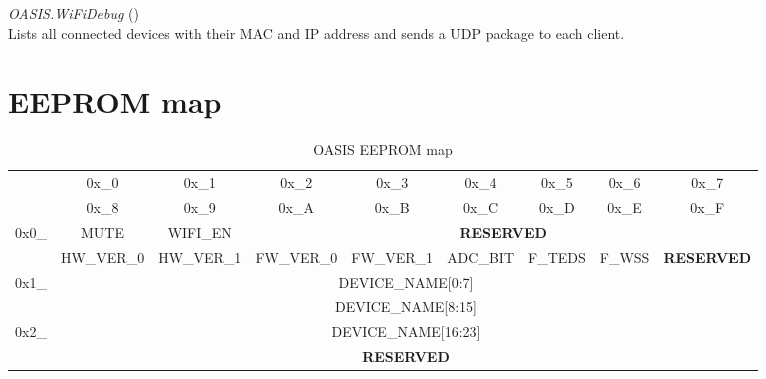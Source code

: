 \documentclass[11pt, a4paper]{article}
\begin{document}
\vspace{3mm}
\textcolor{TBlue}{\textit{OASIS.WiFiDebug}} ()\vspace{3mm}\\
Lists all connected devices with their MAC and IP address and sends a UDP package to each client.

\section*{EEPROM map}
\begin{table}[h!]
	\centering
	\begin{tabular}{c|c|c|c|c|c|c|c|c}
		& 0x\_0 & 0x\_1 & 0x\_2 & 0x\_3 & 0x\_4 & 0x\_5 & 0x\_6 & 0x\_7 \\
		& 0x\_8 & 0x\_9 & 0x\_A & 0x\_B & 0x\_C & 0x\_D & 0x\_E & 0x\_F \\
		\hline
		\multirow{2}{*}{0x0\_} & MUTE & WIFI\_EN & \multicolumn{6}{c}{\textbf{RESERVED}} \\
		\cline{2-9}
		& HW\_VER\_0 & HW\_VER\_1 & FW\_VER\_0 & FW\_VER\_1 & ADC\_BIT & F\_TEDS & F\_WSS & \textbf{RESERVED}\\
		\hline
		\multirow{2}{*}{0x1\_} & \multicolumn{8}{c}{DEVICE\_NAME[0:7]} \\
		\cline{2-9}
		& \multicolumn{8}{c}{DEVICE\_NAME[8:15]}\\
		\hline
		\multirow{2}{*}{0x2\_} & \multicolumn{8}{c}{DEVICE\_NAME[16:23]} \\
		\cline{2-9}
		 & \multicolumn{8}{c}{\textbf{RESERVED}} \\
		\hline
	\end{tabular}
	\caption{OASIS EEPROM map}
	\label{tab:EEPROM}
\end{table}\vspace{-0.5cm}
\end{document}

